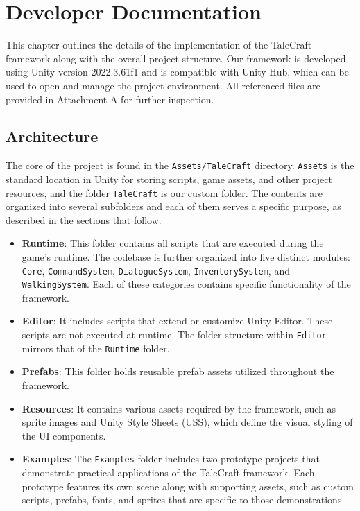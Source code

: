 \chapter{Developer Documentation}
This chapter outlines the details of the implementation of the TaleCraft framework along with the overall project structure. Our framework is developed using Unity version 2022.3.61f1 and is compatible with Unity Hub, which can be used to open and manage the project environment. All referenced files are provided in Attachment A for further inspection.

\section{Architecture}
The core of the project is found in the \verb|Assets/TaleCraft| directory. \verb|Assets| is the standard location in Unity for storing scripts, game assets, and other project resources, and the folder \verb|TaleCraft| is our custom folder. The contents are organized into several subfolders and each of them serves a specific purpose, as described in the sections that follow.

\begin{itemize}
    \item \textbf{Runtime}: This folder contains all scripts that are executed during the game’s runtime. The codebase is further organized into five distinct modules: \verb|Core|, \verb|CommandSystem|, \verb|DialogueSystem|, \verb|InventorySystem|, and \verb|WalkingSystem|. Each of these categories contains specific functionality of the framework.
    \item \textbf{Editor}: It includes scripts that extend or customize Unity Editor. These scripts are not executed at runtime. The folder structure within \verb|Editor| mirrors that of the \verb|Runtime| folder.
    \item \textbf{Prefabs}: This folder holds reusable prefab assets utilized throughout the framework.
    \item \textbf{Resources}: It contains various assets required by the framework, such as sprite images and Unity Style Sheets (USS), which define the visual styling of the UI components. 
    \item \textbf{Examples}: The \verb|Examples| folder includes two prototype projects that demonstrate practical applications of the TaleCraft framework. Each prototype features its own scene along with supporting assets, such as custom scripts, prefabs, fonts, and sprites that are specific to those demonstrations. 
\end{itemize}

